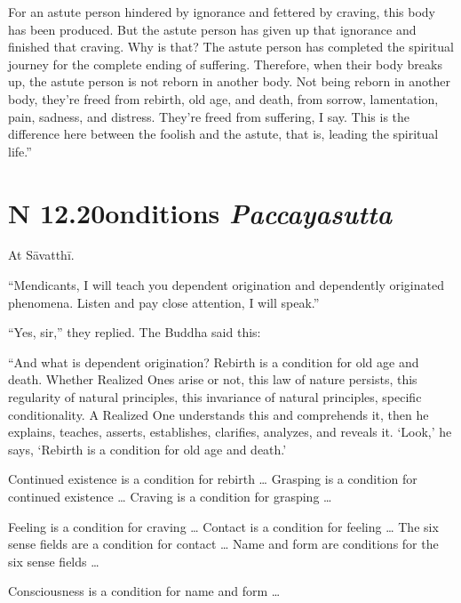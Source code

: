 \documentclass[12pt,openany]{book}%
\newcommand*{\suttatitleacronym}[1]{\smaller[2]{#1}\vspace*{.3em}}
\newcommand*{\suttatitletranslation}[1]{\linebreak{#1}}
\newcommand*{\suttatitleroot}[1]{\linebreak\smaller[2]\itshape{#1}}
\newcommand*{\tocacronym}[1]{\hspace*{-3.3em}{#1}\quad}
\newcommand*{\toctranslation}[1]{#1}
\newcommand*{\tocroot}[1]{(\textit{#1})}
\begin{document}
For an astute person hindered by ignorance and fettered by craving, this body has been produced. But the astute person has given up that ignorance and finished that craving. Why is that? The astute person has completed the spiritual journey for the complete ending of suffering. Therefore, when their body breaks up, the astute person is not reborn in another body. Not being reborn in another body, they’re freed from rebirth, old age, and death, from sorrow, lamentation, pain, sadness, and distress. They’re freed from suffering, I say. This is the difference here between the foolish and the astute, that is, leading the spiritual life.” 

%
\section*{{\suttatitleacronym SN 12.20}{\suttatitletranslation Conditions }{\suttatitleroot Paccayasutta}}
\addcontentsline{toc}{section}{\tocacronym{SN 12.20} \toctranslation{Conditions } \tocroot{Paccayasutta}}

At \textsanskrit{Sāvatthī}. 

“Mendicants, I will teach you dependent origination and dependently originated phenomena. Listen and pay close attention, I will speak.” 

“Yes, sir,” they replied. The Buddha said this: 

“And what is dependent origination? Rebirth is a condition for old age and death. Whether Realized Ones arise or not, this law of nature persists, this regularity of natural principles, this invariance of natural principles, specific conditionality. A Realized One understands this and comprehends it, then he explains, teaches, asserts, establishes, clarifies, analyzes, and reveals it. ‘Look,’ he says, ‘Rebirth is a condition for old age and death.’ 

Continued existence is a condition for rebirth … Grasping is a condition for continued existence … Craving is a condition for grasping … 

Feeling is a condition for craving … Contact is a condition for feeling … The six sense fields are a condition for contact … Name and form are conditions for the six sense fields … 

Consciousness is a condition for name and form … 
\end{document}
